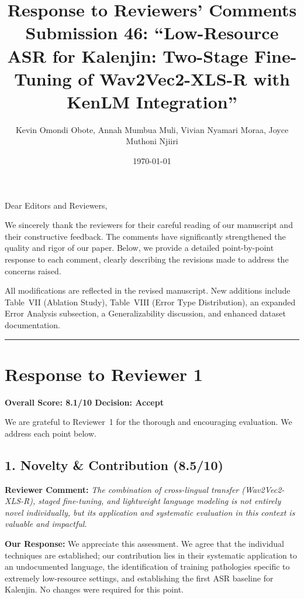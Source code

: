 \documentclass[11pt]{article}
\title{\textbf{Response to Reviewers' Comments}\\[0.5em]
\large Submission 46: ``Low-Resource ASR for Kalenjin: Two-Stage Fine-Tuning of Wav2Vec2-XLS-R with KenLM Integration''}
\author{Kevin Omondi Obote, Annah Mumbua Muli, Vivian Nyamari Moraa, Joyce Muthoni Njiiri}
\date{\today}
\newcommand{\reviewercomment}[1]{\textcolor{reviewercolor}{\textbf{Reviewer Comment:} \textit{#1}}}
\newcommand{\response}[1]{\textcolor{responsecolor}{\textbf{Our Response:} #1}}
\begin{document}
\maketitle

\noindent Dear Editors and Reviewers,

\vspace{0.5em}

\noindent We sincerely thank the reviewers for their careful reading of our manuscript and their constructive feedback. The comments have significantly strengthened the quality and rigor of our paper. Below, we provide a detailed point-by-point response to each comment, clearly describing the revisions made to address the concerns raised.

\vspace{0.5em}

\noindent All modifications are reflected in the revised manuscript. New additions include Table~VII (Ablation Study), Table~VIII (Error Type Distribution), an expanded Error Analysis subsection, a Generalizability discussion, and enhanced dataset documentation.

\vspace{1.5em}

\hrule
\vspace{1em}

\section*{Response to Reviewer 1}
\textbf{Overall Score: 8.1/10 \quad Decision: Accept}

\vspace{0.5em}

We are grateful to Reviewer~1 for the thorough and encouraging evaluation. We address each point below.

\vspace{1em}

\subsection*{1. Novelty \& Contribution (8.5/10)}

\reviewercomment{The combination of cross-lingual transfer (Wav2Vec2-XLS-R), staged fine-tuning, and lightweight language modeling is not entirely novel individually, but its application and systematic evaluation in this context is valuable and impactful.}

\response{We appreciate this assessment. We agree that the individual techniques are established; our contribution lies in their systematic application to an undocumented language, the identification of training pathologies specific to extremely low-resource settings, and establishing the first ASR baseline for Kalenjin. No changes were required for this point.}
\end{document}
